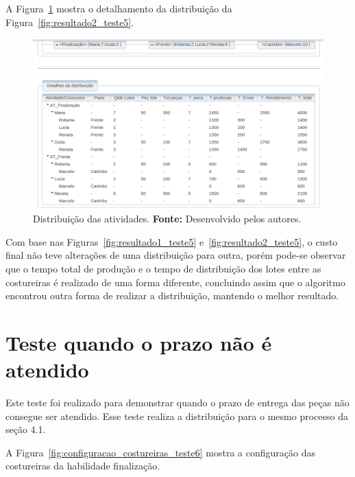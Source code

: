 \par A Figura~\ref{fig:detalhamento2_teste5} mostra o detalhamento da
distribuição da Figura~\ref{fig:resultado2_teste5}.

\begin{figure}[h!]
	\centerline{\includegraphics[width=14.7cm]{./imagens/detalhamento2_teste5.png}}
	\caption[Distribuição das atividades.] 
	{Distribuição das atividades. \textbf{Fonte:} Desenvolvido pelos
	autores.}
	\label{fig:detalhamento2_teste5}
\end{figure}


\par Com base nas Figuras~\ref{fig:resultado1_teste5}
e~\ref{fig:resultado2_teste5}, o custo final não teve alterações de uma distribuição para outra, porém 
pode-se observar que o tempo total de produção e o tempo de
distribuição dos lotes entre as costureiras é realizado de uma forma
diferente, concluindo assim que o algoritmo encontrou outra forma de realizar a
distribuição, mantendo o melhor resultado.

\section{Teste quando o prazo não é atendido}

\par Este teste foi realizado para demonstrar quando o prazo de entrega das
peças não consegue ser atendido. Esse teste realiza a distribuição para o mesmo
processo da seção 4.1.

\par A Figura~\ref{fig:configuracao_costureiras_teste6} mostra a configuração
das costureiras da habilidade finalização.

